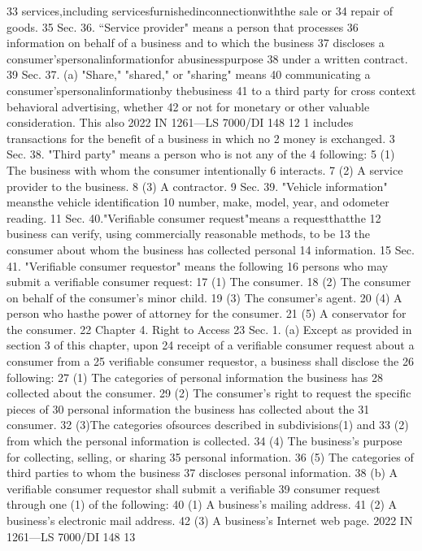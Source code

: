 33 services,including servicesfurnishedinconnectionwiththe sale or
34 repair of goods.
35 Sec. 36. “Service provider" means a person that processes
36 information on behalf of a business and to which the business
37 discloses a consumer'spersonalinformationfor abusinesspurpose
38 under a written contract.
39 Sec. 37. (a) "Share," "shared," or "sharing" means
40 communicating a consumer'spersonalinformationby thebusiness
41 to a third party for cross context behavioral advertising, whether
42 or not for monetary or other valuable consideration. This also
2022 IN 1261—LS 7000/DI 148
12
1 includes transactions for the benefit of a business in which no
2 money is exchanged.
3 Sec. 38. "Third party" means a person who is not any of the
4 following:
5 (1) The business with whom the consumer intentionally
6 interacts.
7 (2) A service provider to the business.
8 (3) A contractor.
9 Sec. 39. "Vehicle information" meansthe vehicle identification
10 number, make, model, year, and odometer reading.
11 Sec. 40."Verifiable consumer request"means a requestthatthe
12 business can verify, using commercially reasonable methods, to be
13 the consumer about whom the business has collected personal
14 information.
15 Sec. 41. "Verifiable consumer requestor" means the following
16 persons who may submit a verifiable consumer request:
17 (1) The consumer.
18 (2) The consumer on behalf of the consumer's minor child.
19 (3) The consumer's agent.
20 (4) A person who hasthe power of attorney for the consumer.
21 (5) A conservator for the consumer.
22 Chapter 4. Right to Access
23 Sec. 1. (a) Except as provided in section 3 of this chapter, upon
24 receipt of a verifiable consumer request about a consumer from a
25 verifiable consumer requestor, a business shall disclose the
26 following:
27 (1) The categories of personal information the business has
28 collected about the consumer.
29 (2) The consumer's right to request the specific pieces of
30 personal information the business has collected about the
31 consumer.
32 (3)The categories ofsources described in subdivisions(1) and
33 (2) from which the personal information is collected.
34 (4) The business's purpose for collecting, selling, or sharing
35 personal information.
36 (5) The categories of third parties to whom the business
37 discloses personal information.
38 (b) A verifiable consumer requestor shall submit a verifiable
39 consumer request through one (1) of the following:
40 (1) A business's mailing address.
41 (2) A business's electronic mail address.
42 (3) A business's Internet web page.
2022 IN 1261—LS 7000/DI 148
13
